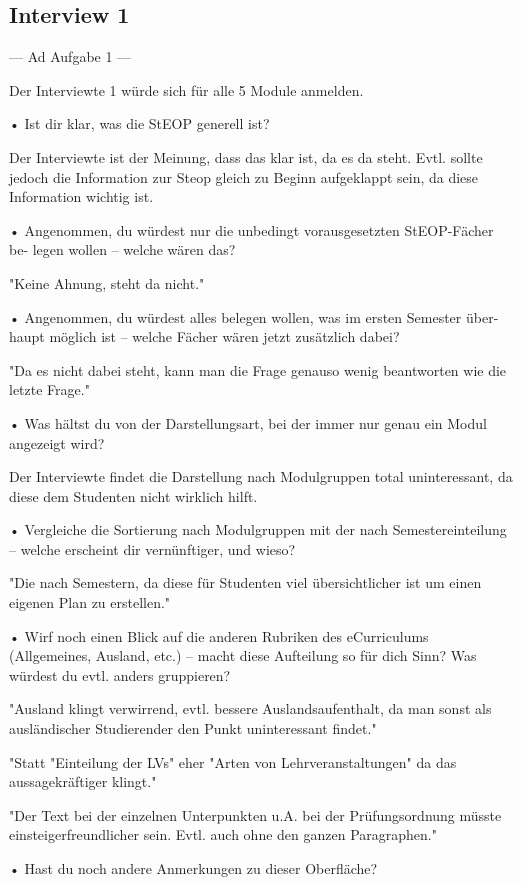 \documentclass[a4paper,10pt]{scrartcl}
\begin{document}
\subsection*{Interview 1}

---
Ad Aufgabe 1
---

Der Interviewte 1 würde sich für alle 5 Module anmelden.

• Ist dir klar, was die StEOP generell ist?

Der Interviewte ist der Meinung, dass das klar ist, da es da steht. Evtl. sollte jedoch die Information zur Steop gleich zu Beginn aufgeklappt sein, da diese Information wichtig ist.


• Angenommen, du würdest nur die unbedingt vorausgesetzten StEOP-Fächer be-
legen wollen – welche wären das?

"Keine Ahnung, steht da nicht."


• Angenommen, du würdest alles belegen wollen, was im ersten Semester über-
haupt möglich ist – welche Fächer wären jetzt zusätzlich dabei?

"Da es nicht dabei steht, kann man die Frage genauso wenig beantworten wie die letzte Frage."


• Was hältst du von der Darstellungsart, bei der immer nur genau ein Modul
angezeigt wird?

Der Interviewte findet die Darstellung nach Modulgruppen total uninteressant, da diese dem Studenten nicht wirklich hilft.

• Vergleiche die Sortierung nach Modulgruppen mit der nach Semestereinteilung
– welche erscheint dir vernünftiger, und wieso?

"Die nach Semestern, da diese für Studenten viel übersichtlicher ist um einen eigenen Plan zu erstellen."


• Wirf noch einen Blick auf die anderen Rubriken des eCurriculums (Allgemeines,
Ausland, etc.) – macht diese Aufteilung so für dich Sinn? Was würdest du evtl.
anders gruppieren?

"Ausland klingt verwirrend, evtl. bessere Auslandsaufenthalt, da man sonst als ausländischer Studierender den Punkt uninteressant findet."

"Statt "Einteilung der LVs" eher "Arten von Lehrveranstaltungen" da das aussagekräftiger klingt."

"Der Text bei der einzelnen Unterpunkten u.A. bei der Prüfungsordnung müsste einsteigerfreundlicher sein. Evtl. auch ohne den ganzen Paragraphen."


• Hast du noch andere Anmerkungen zu dieser Oberfläche?
\end{document}
